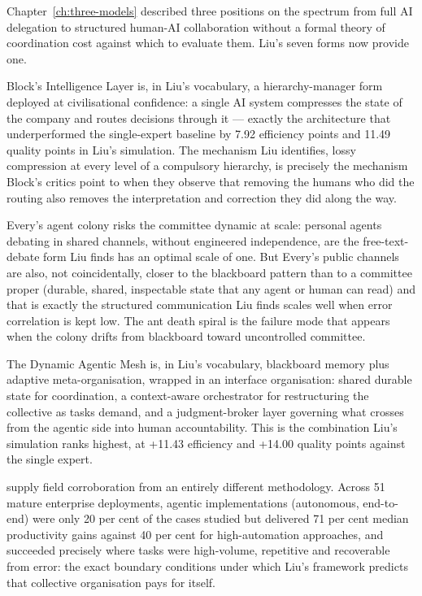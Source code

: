 Chapter~\ref{ch:three-models} described three positions on the spectrum from full AI delegation to structured human-AI collaboration without a formal theory of coordination cost against which to evaluate them. Liu's seven forms now provide one.

Block's Intelligence Layer is, in Liu's vocabulary, a hierarchy-manager form deployed at civilisational confidence: a single AI system compresses the state of the company and routes decisions through it --- exactly the architecture that underperformed the single-expert baseline by 7.92 efficiency points and 11.49 quality points in Liu's simulation. The mechanism Liu identifies, lossy compression at every level of a compulsory hierarchy, is precisely the mechanism Block's critics point to when they observe that removing the humans who did the routing also removes the interpretation and correction they did along the way.

Every's agent colony risks the committee dynamic at scale: personal agents debating in shared channels, without engineered independence, are the free-text-debate form Liu finds has an optimal scale of one. But Every's public channels are also, not coincidentally, closer to the blackboard pattern than to a committee proper (durable, shared, inspectable state that any agent or human can read) and that is exactly the structured communication Liu finds scales well when error correlation is kept low. The ant death spiral is the failure mode that appears when the colony drifts from blackboard toward uncontrolled committee.

The Dynamic Agentic Mesh is, in Liu's vocabulary, blackboard memory plus adaptive meta-organisation, wrapped in an interface organisation: shared durable state for coordination, a context-aware orchestrator for restructuring the collective as tasks demand, and a judgment-broker layer governing what crosses from the agentic side into human accountability. This is the combination Liu's simulation ranks highest, at +11.43 efficiency and +14.00 quality points against the single expert.

\textcite{Pereira2026Playbook} supply field corroboration from an entirely different methodology. Across 51 mature enterprise deployments, agentic implementations (autonomous, end-to-end) were only 20 per cent of the cases studied but delivered 71 per cent median productivity gains against 40 per cent for high-automation approaches, and succeeded precisely where tasks were high-volume, repetitive and recoverable from error: the exact boundary conditions under which Liu's framework predicts that collective organisation pays for itself.

